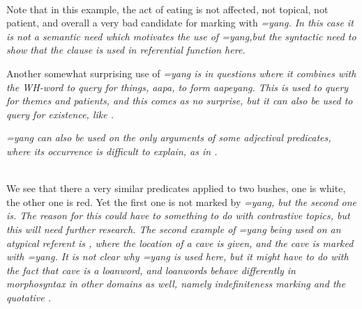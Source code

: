 \\ 

Note that in this example, the act of eating is not affected, not topical, not patient, and overall a very bad candidate for marking with \em =yang\em. In this case it is not a semantic need which motivates the use of \em =yang,\em but the syntactic need to show that the clause is used in referential function here.

Another somewhat surprising use of \em =yang \em is in questions where it combines with the WH-word to query for things, \em aapa\em, to form \em aapeyang\em. This is used to query for themes and patients, and this comes as no surprise, but it can also be used to query for existence, like .






\em =yang \em can also be used on the only arguments of some adjectival predicates, where its occurrence is difficult to explain, as in .

\\ 

We see that there a very similar predicates applied to two bushes, one is white, the other one is red. Yet the first one is not marked by \em=yang, \em but the second one is. The reason for this could have to something to do with contrastive topics, but this will need further research. The second example of \em =yang \em being used on an atypical referent is , where the location of a cave is given, and the cave is marked with \em =yang\em. It is not clear why \em =yang \em is used here, but it might have to do with the fact that \em cave \em is a loanword, and loanwords behave differently in morphosyntax in other domains as well, namely indefiniteness marking  and the quotative .


